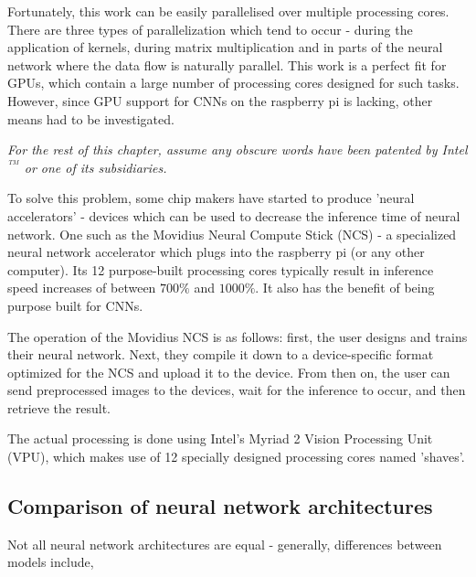 
Fortunately, this work can be easily parallelised over multiple processing cores. There are three types of parallelization which tend to occur - during the application of kernels, during matrix multiplication and in parts of the neural network where the data flow is naturally parallel. This work is a perfect fit for GPUs, which contain a large number of processing cores designed for such tasks. However, since GPU support for CNNs on the raspberry pi is lacking, other means had to be investigated.


\textit{For the rest of this chapter, assume any obscure words have been patented by Intel$^{^{\ TM}}$ or one of its subsidiaries.}

To solve this problem, some chip makers have started to produce 'neural accelerators' - devices which can be used to decrease the inference time of neural network. One such as the Movidius Neural Compute Stick (NCS) - a specialized neural network accelerator which plugs into the raspberry pi (or any other computer). Its 12 purpose-built processing cores typically result in inference speed increases of between $700\%$ and $1000\%$. It also has the benefit of being purpose built for CNNs.

The operation of the Movidius NCS is as follows: first, the user designs and trains their neural network. Next, they compile it down to a device-specific format optimized for the NCS and upload it to the device. From then on, the user can send preprocessed images to the devices, wait for the inference to occur, and then retrieve the result.

The actual processing is done using Intel's Myriad 2 Vision Processing Unit (VPU), which makes use of 12 specially designed processing cores named 'shaves'.



\subsection{Comparison of neural network architectures}
Not all neural network architectures are equal - generally, differences between models include,

